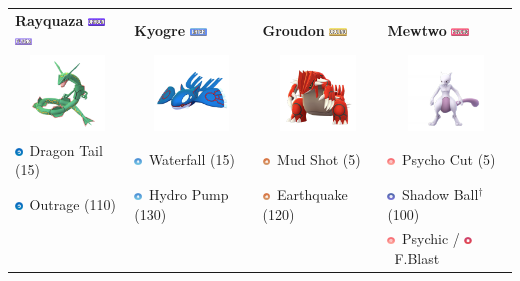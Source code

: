 \documentclass[12pt]{beamer}
\newcommand{\flyingfull}{\includegraphics[height=0.2cm]{../../images/type/full/Flying.png}}
\newcommand{\dragonfull}{\includegraphics[height=0.2cm]{../../images/type/full/Dragon.png}}
\newcommand{\groundfull}{\includegraphics[height=0.2cm]{../../images/type/full/Ground.png}}
\newcommand{\psychicfull}{\includegraphics[height=0.2cm]{../../images/type/full/Psychic.png}}
\newcommand{\waterfull}{\includegraphics[height=0.2cm]{../../images/type/full/Water.png}}
\newcommand{\fightingsimp}{\includegraphics[height=0.2cm]{../../images/type/simplified/fighting.png}}
\newcommand{\dragonsimp}{\includegraphics[height=0.2cm]{../../images/type/simplified/dragon.png}}
\newcommand{\ghostsimp}{\includegraphics[height=0.2cm]{../../images/type/simplified/ghost.png}}
\newcommand{\psysimp}{\includegraphics[height=0.2cm]{../../images/type/simplified/psy.png}}
\newcommand{\groundsimp}{\includegraphics[height=0.2cm]{../../images/type/simplified/ground.png}}
\newcommand{\watersimp}{\includegraphics[height=0.2cm]{../../images/type/simplified/water.png}}
\begin{document}
\begin{frame}
\begin{footnotesize}
\begin{block}{}
\begin{center}
\begin{tabular}{p{3cm}p{3cm}p{3cm}p{3cm}} 
\textbf{Rayquaza} \hfill \dragonfull~\flyingfull  & \textbf{Kyogre} \hfill  \waterfull & \textbf{Groudon} \hfill \groundfull & \textbf{Mewtwo} \hfill \psychicfull \\ 
\multicolumn{1}{c}{\includegraphics[width=2cm]{../../images/pokemon/Rayquaza}} &   \multicolumn{1}{c}{\includegraphics[width=2cm]{../../images/pokemon/Kyogre} } &   \multicolumn{1}{c}{\includegraphics[width=2cm]{../../images/pokemon/Groudon} } &   \multicolumn{1}{c}{\includegraphics[width=2cm]{../../images/pokemon/Mewtwo} }   \\ 
 \dragonsimp~Dragon Tail (15) &\watersimp~Waterfall (15) & \groundsimp~Mud Shot (5)  & \psysimp~Psycho Cut (5)  \\
\dragonsimp~Outrage (110) & \watersimp~Hydro Pump (130) &  \groundsimp~Earthquake (120) & \ghostsimp~Shadow Ball$^{\dag}$(100)  \\    
& & & \psysimp~Psychic / \fightingsimp~F.Blast \\ 
\end{tabular}

\end{center}
\end{block}
\end{footnotesize}
\end{frame}
\end{document}
